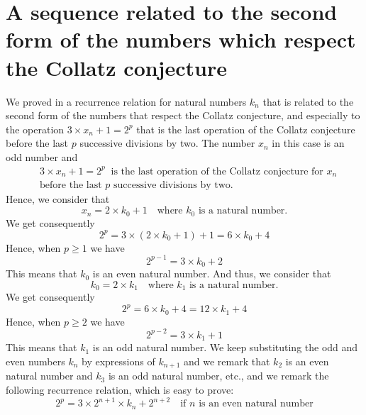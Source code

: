 \documentclass[11pt,a4paper]{article}
\theoremstyle{definition}
\begin{document}
\section{A sequence related to the second form of the numbers which respect the Collatz conjecture}
We proved in \citep{Louiz2024} a recurrence relation for natural numbers $k_n$ that is related
to the second form of the numbers that respect the Collatz conjecture, and especially to the
operation $3\times x_n+1=2^{p}$ that is the last operation of the Collatz conjecture before
the last $p$ successive divisions by two. The number $x_n$ in this case is an odd number and
\begin{equation}
\begin{split}
&3\times x_n+1=2^{p}\ \text{ is the last operation of the Collatz conjecture for }x_n\\
&\text{before the last }p\text{ successive divisions by two.}
\end{split}
\end{equation}
Hence, we consider that
\begin{equation}
x_n=2\times k_0+1\quad\text{where }k_0\text{ is a natural number.}
\end{equation}
We get consequently
\begin{equation}
2^{p}=3\times(2\times k_0+1)+1=6\times k_0+4
\end{equation}
Hence, when $p\ge 1$ we have
\begin{equation}
2^{p-1}=3\times k_0+2
\end{equation}
This means that $k_0$ is an even natural number. And thus, we consider that
\begin{equation}
k_0=2\times k_1\quad\text{where }k_1\text{ is a natural number.}
\end{equation}
We get consequently
\begin{equation}
2^{p}=6\times k_0+4=12\times k_1+4
\end{equation}
Hence, when $p\ge 2$ we have
\begin{equation}
2^{p-2}=3\times k_1+1
\end{equation}
This means that $k_1$ is an odd natural number. We keep substituting the odd and even numbers
$k_n$ by expressions of $k_{n+1}$ and we remark that $k_2$ is an even natural number and
$k_3$ is an odd natural number, etc., and we remark the following recurrence relation, which
is easy to prove:
\begin{equation}
2^{p}=3\times 2^{n+1}\times k_n+2^{n+2}\quad\text{if }n\text{ is an even natural number}
\end{equation}
\end{document}
